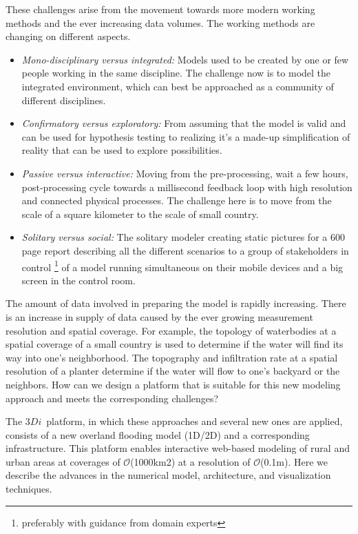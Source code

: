\documentclass[a4paper]{article}
\DeclareRobustCommand{\orderof}{\ensuremath{\mathcal{O}}}
\DeclareRobustCommand{\threedi}{$3Di$~}
\begin{document}
These challenges arise from the movement towards more modern working methods and the ever increasing data volumes. The working methods are changing on different aspects.
\begin{itemize}
\item \emph{Mono-disciplinary versus integrated:} Models used to be created by one or few people working in the same discipline. The challenge now is to model the integrated environment, which can best be approached as a community \citep{Voinov2010} of different disciplines.
\item \emph{Confirmatory versus exploratory:} From assuming that the model is valid and can be used for hypothesis testing to realizing it's a made-up simplification of reality \citep{Oreskes1994} that can be used to explore possibilities.
\item \emph{Passive versus interactive:} Moving from the pre-processing, wait a few hours, post-processing cycle towards a millisecond feedback loop with high resolution and connected physical processes. The challenge here is to move from the scale of a square kilometer \citep[for example][]{Losasso2008} to the scale of small country.
\item \emph{Solitary versus social:} The solitary modeler creating static pictures for a 600 page report describing all the different scenarios to a group of stakeholders in control \footnote{preferably with guidance from domain experts} of a model running simultaneous on their mobile devices and a big screen in the control room.
\end{itemize}

The amount of data involved in preparing the model is rapidly increasing. There is an increase in supply of data caused by the ever growing measurement resolution and spatial coverage. For example, the topology of waterbodies at a spatial coverage of a small country is used to determine if the water will find its way into one's neighborhood. The topography and infiltration rate at a spatial resolution of a planter determine if the water will flow to one's backyard or the neighbors. How can we design a platform that is suitable for this new modeling approach and meets the corresponding challenges?

The \threedi  platform, in which these approaches and several new ones are applied, consists of a new overland flooding model (1D/2D) and a corresponding infrastructure. This platform enables interactive web-based modeling of rural and urban areas at coverages of \orderof(1000km2) at a resolution of \orderof(0.1m). Here we describe the advances in the numerical model, architecture, and visualization techniques.
\end{document}
